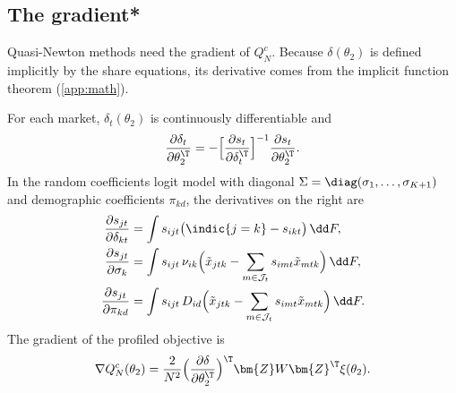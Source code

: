 \subsection{The gradient*}\label{sec:08-gradient}

Quasi-Newton methods need the gradient of $Q^c_N$. Because $\delta(\theta_2)$ is defined implicitly by the
share equations, its derivative comes from the implicit function theorem (\cref{app:math}).

\begin{proposition}\label{prop:08-gradient}
For each market, $\delta_t(\theta_2)$ is continuously differentiable and
\begin{equation}\label{eq:08-ift}
  \frac{\partial \delta_t}{\partial \theta_2^\T} = -\Big[\frac{\partial s_t}{\partial
  \delta_t^\T}\Big]^{-1}\frac{\partial s_t}{\partial \theta_2^\T}.
\end{equation}
In the random coefficients logit model with diagonal $\Sigma = \diag(\sigma_1, \dots, \sigma_{K+1})$ and
demographic coefficients $\pi_{kd}$, the derivatives on the right are
\begin{align}
  \frac{\partial s_{jt}}{\partial \delta_{kt}} &= \int s_{ijt}\big(\indic\{j = k\} - s_{ikt}\big)\, \dd F,
  \notag\\
  \frac{\partial s_{jt}}{\partial \sigma_k} &= \int s_{ijt}\,\nu_{ik}\Big(\tilde x_{jtk} - \sum_{m \in
  \mathcal{J}_t}s_{imt}\tilde x_{mtk}\Big)\, \dd F, \label{eq:08-dsdsigma}\\
  \frac{\partial s_{jt}}{\partial \pi_{kd}} &= \int s_{ijt}\,D_{id}\Big(\tilde x_{jtk} - \sum_{m \in
  \mathcal{J}_t}s_{imt}\tilde x_{mtk}\Big)\, \dd F. \notag
\end{align}
The gradient of the profiled objective is
\begin{equation}\label{eq:08-grad}
  \nabla Q^c_N(\theta_2) = \frac{2}{N^2}\Big(\frac{\partial \delta}{\partial \theta_2^\T}\Big)^\T
  \bm{Z}W\bm{Z}^\T\xi(\theta_2).
\end{equation}
\end{proposition}

